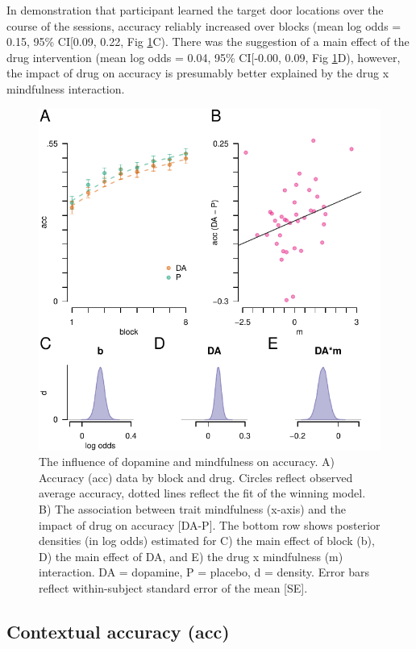 \documentclass{article}
\begin{document}
In demonstration that participant learned the target door locations over
the course of the sessions, accuracy reliably increased over blocks
(mean log odds = 0.15, 95\% CI{[}0.09, 0.22, Fig \ref{fig:accfig}C).
There was the suggestion of a main effect of the drug intervention (mean
log odds = 0.04, 95\% CI{[}-0.00, 0.09, Fig \ref{fig:accfig}D), however,
the impact of drug on accuracy is presumably better explained by the
drug x mindfulness interaction.

\begin{figure}

{\centering \includegraphics[width=0.7\linewidth]{../../images/acc_fig} 

}

\caption{The influence of dopamine and mindfulness on accuracy. A) Accuracy (acc) data by block and drug. Circles reflect observed average accuracy, dotted lines reflect the fit of the winning model. B) The association between trait mindfulness (x-axis) and the impact of drug on accuracy [DA-P]. The bottom row shows posterior densities (in log odds) estimated for C) the main effect of block (b), D) the main effect of DA, and E) the drug x mindfulness (m) interaction. DA = dopamine, P = placebo, d = density. Error bars reflect within-subject standard error of the mean [SE].}\label{fig:accfig}
\end{figure}

\hypertarget{contextual-accuracy-acc}{%
\subsection{Contextual accuracy (acc)}\label{contextual-accuracy-acc}}
\end{document}
